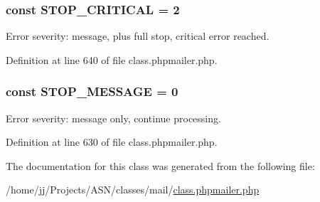 \subsubsection[{\texorpdfstring{S\+T\+O\+P\+\_\+\+C\+R\+I\+T\+I\+C\+AL}{STOP_CRITICAL}}]{\setlength{\rightskip}{0pt plus 5cm}const S\+T\+O\+P\+\_\+\+C\+R\+I\+T\+I\+C\+AL = 2}\hypertarget{class_p_h_p_mailer_a9f37e989efccad58c693cdb0481c881f}{}\label{class_p_h_p_mailer_a9f37e989efccad58c693cdb0481c881f}
Error severity\+: message, plus full stop, critical error reached. 

Definition at line 640 of file class.\+phpmailer.\+php.

\subsubsection[{\texorpdfstring{S\+T\+O\+P\+\_\+\+M\+E\+S\+S\+A\+GE}{STOP_MESSAGE}}]{\setlength{\rightskip}{0pt plus 5cm}const S\+T\+O\+P\+\_\+\+M\+E\+S\+S\+A\+GE = 0}\hypertarget{class_p_h_p_mailer_a18ac47549c5fb56a395b374b3c23f04f}{}\label{class_p_h_p_mailer_a18ac47549c5fb56a395b374b3c23f04f}
Error severity\+: message only, continue processing. 

Definition at line 630 of file class.\+phpmailer.\+php.



The documentation for this class was generated from the following file\+:\begin{DoxyCompactItemize}
\item 
/home/jj/\+Projects/\+A\+S\+N/classes/mail/\hyperlink{class_8phpmailer_8php}{class.\+phpmailer.\+php}\end{DoxyCompactItemize}
